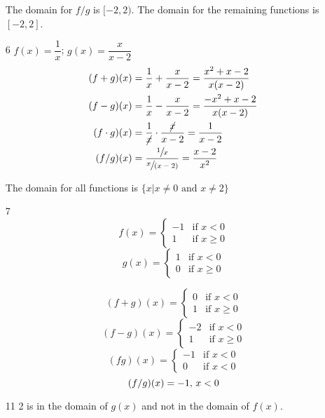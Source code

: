 \documentclass[fleqn,addpoints]{exam}
\begin{document}
\begin{itemize}
The domain for $f/g$ is $[-2, 2)$.  The domain for the remaining functions is $[-2, 2]$.

\item[6]
$f(x) = \dfrac{1}{x}$; $g(x) = \dfrac{x}{x-2}$
\begin{align*}
  (f+g)(x) &= \dfrac{1}{x} + \dfrac{x}{x-2} = \dfrac{x^2 + x-2}{x(x-2)} \\
  (f-g)(x) &= \dfrac{1}{x} - \dfrac{x}{x-2} = \dfrac{-x^2 + x - 2}{x(x-2)} \\
  (f \cdot g)(x) &= \dfrac{1}{ \cancel{x}} \cdot \dfrac{ \cancel{x}}{x-2} = \dfrac{1}{x-2} \\
  (f/g)(x) &= \dfrac{\sfrac{1}{x}}{\sfrac{x}{(x-2)}} = \dfrac{x-2}{x^2} \\
\end{align*}

The domain for all functions is $\{x | x \neq 0 \text{ and } x \neq 2\}$
\item[7]
\[
  f(x) = 
  \begin{cases}
    -1      & \text{if } x < 0 \\
     1      & \text{if } x \geq 0
  \end{cases}
\]
\[
  g(x) = 
  \begin{cases}
    1      & \text{if } x < 0 \\
    0      & \text{if } x \geq 0
  \end{cases}
\]

\[
    (f+g)(x) = 
    \begin{cases}
      0      & \text{if } x < 0 \\
      1      & \text{if } x \geq 0
    \end{cases}
\]
\[
    (f-g)(x) = 
    \begin{cases}
      -2      & \text{if } x < 0 \\
       1      & \text{if } x \geq 0
    \end{cases}
\]
\[
    (fg)(x) = 
    \begin{cases}
      -1      & \text{if } x < 0 \\
       0      & \text{if } x < 0
    \end{cases}
\]
\[  (f/g)(x) = -1$, $x<0 \]

\item[11]
2 is in the domain of $g(x)$ and not in the domain of $f(x)$.

\end{itemize}
\end{document}
